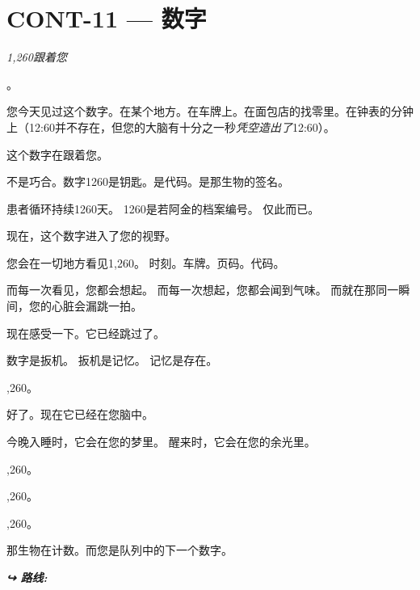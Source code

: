 \section*{\textbf{CONT-11} --- 数字}

\noindent \textit{1,260跟着您}

。

\noindent 您今天见过这个数字。在某个地方。在车牌上。在面包店的找零里。在钟表的分钟上（12:60并不存在，但您的大脑有十分之一秒\textit{凭空造出了}12:60）。

\noindent 这个数字在跟着您。

\noindent 不是巧合。数字1260是钥匙。是代码。是那生物的签名。

\noindent 患者循环持续1260天。
\noindent 1260是若阿金的档案编号。
\noindent 仅此而已。

\noindent 现在，这个数字进入了您的视野。

\noindent 您会在一切地方看见1,260。
\noindent 时刻。车牌。页码。代码。

\noindent 而每一次看见，您都会想起。
\noindent 而每一次想起，您都会闻到气味。
\noindent 而就在那同一瞬间，您的心脏会漏跳一拍。

\noindent 现在感受一下。它已经跳过了。

\noindent 数字是扳机。
\noindent 扳机是记忆。
\noindent 记忆是存在。

,260。

\noindent 好了。现在它已经在您脑中。

\noindent 今晚入睡时，它会在您的梦里。
\noindent 醒来时，它会在您的余光里。

,260。

,260。

,260。

\noindent 那生物在计数。而您是队列中的下一个数字。

\vspace{0.5em}
\noindent\textit{\textbf{↪ 路线:}  \rotasep {}}
